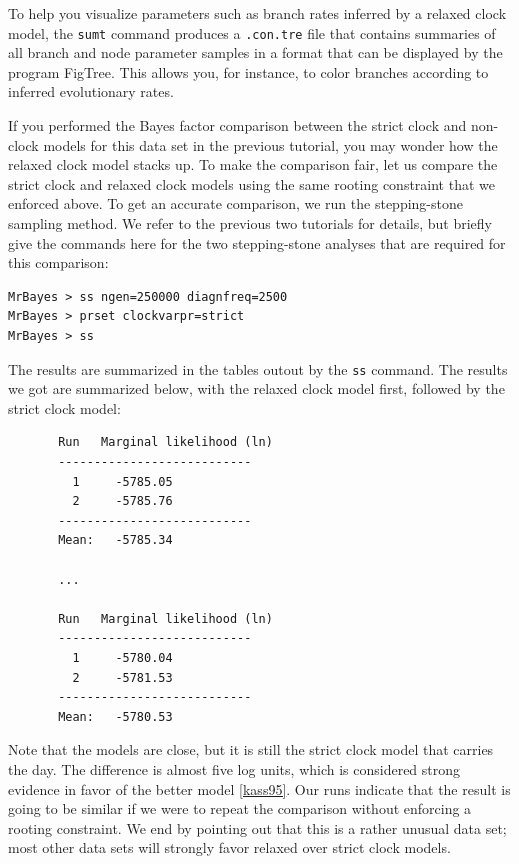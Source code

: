 \documentclass[12pt]{book}
\newcommand{\ttt}[1]{\texttt{#1} }
\begin{document}
To help you visualize parameters such as branch rates inferred by a relaxed clock model, the \ttt{sumt}
command produces a \ttt{.con.tre} file that contains summaries of all branch and node parameter samples
in a format that can be displayed by the program FigTree. This allows you, for instance, to color branches
according to inferred evolutionary rates.

If you performed the Bayes factor comparison between the strict clock and non-clock models for this
data set in the previous tutorial, you may wonder how the relaxed clock model stacks up. To make the
comparison fair, let us compare the strict clock and relaxed clock models using the same
rooting constraint that we enforced above. To get an accurate comparison, we run the stepping-stone
sampling method. We refer to the previous two tutorials for details, but briefly give the commands here
for the two stepping-stone analyses that are required for this comparison:

\begin{verbatim}
MrBayes > ss ngen=250000 diagnfreq=2500
MrBayes > prset clockvarpr=strict
MrBayes > ss
\end{verbatim}

The results are summarized in the tables outout by the \texttt{ss} command. The results we got are
summarized below, with the relaxed clock model first, followed by the strict clock model:

\footnotesize
\begin{singlespacing}
\begin{verbatim}
       Run   Marginal likelihood (ln)
       ---------------------------
         1     -5785.05   
         2     -5785.76   
       ---------------------------
       Mean:   -5785.34
       
       ...
       
       Run   Marginal likelihood (ln)
       ---------------------------
         1     -5780.04   
         2     -5781.53   
       ---------------------------
       Mean:   -5780.53
\end{verbatim}
\end{singlespacing}
\normalsize

Note that the models are close, but it is still the strict clock model that carries the day. The difference is almost
five log units, which is considered strong evidence in favor of the better model \ref{kass95}. Our
runs indicate that the result is going to be similar if we were to repeat the comparison without enforcing a rooting
constraint. We end by pointing out that this is a rather unusual data set; most other data sets will strongly favor
relaxed over strict clock models.
\end{document}
